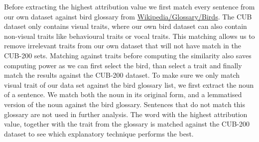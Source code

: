 \documentclass[a4paper, 12pt, oneside]{book} %
\begin{document}
Before extracting the highest attribution value we first match every sentence from our own dataset against bird glossary from \href{https://en.wikipedia.org/wiki/Glossary_of_bird_terms}{Wikipedia/Glossary/Birds}.
The CUB dataset only contains visual traits, where our own bird dataset can also contain non-visual traits like behavioural traits or vocal traits.
This matching allows us to remove irrelevant traits from our own dataset that will not have match in the CUB-200 sets.
Matching against traits before computing the similarity also saves computing power as we can first select the bird, than select a trait and finally match the results against the CUB-200 dataset.
To make sure we only match visual trait of our data set against the bird glossary list, we first extract the noun of a sentence.
We match both the noun in its original form, and a lemmatised version of the noun against the bird glossary.
Sentences that do not match this glossary are not used in further analysis.
The word with the highest attribution value, together with the trait from the glossary is matched against the CUB-200 dataset to see which explanatory technique performs the best.
\end{document}
